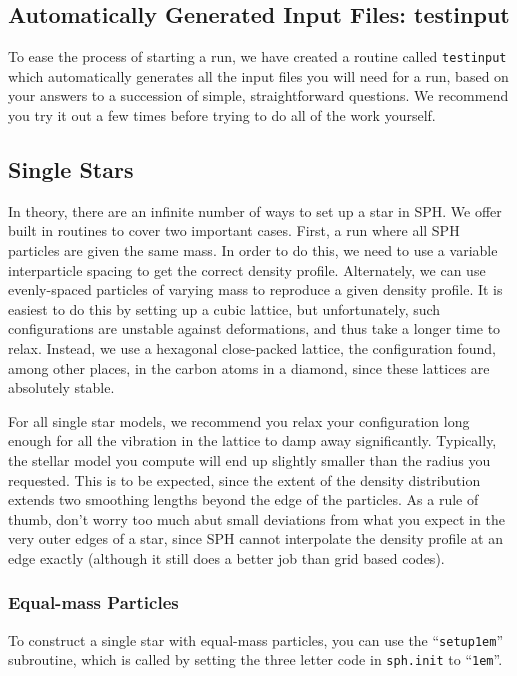 \subsection{Automatically Generated Input Files: testinput}
\label{in:test}

To ease the process of starting a run, we have created a routine
called {\tt testinput} which automatically generates all the input
files you will need for a run, based on your answers to a succession of
simple, straightforward questions. 
We recommend you try it out a few times before trying to do all of
the work yourself. 

\subsection{Single Stars}
\label{in:1s}
In theory, there are an infinite number of ways to set up a star in
SPH.  We offer built in routines to cover two important cases.  First,
a run where all SPH particles are given the same mass.  In order to do
this, we need to use a variable interparticle spacing to get the
correct density profile. Alternately, we can use evenly-spaced
particles of varying mass to reproduce a given density profile.  It is
easiest to do this by setting up a cubic lattice, but unfortunately,
such configurations are unstable against deformations, and thus take a
longer time to relax. Instead, we use a hexagonal close-packed
lattice, the configuration found, among other places, in the carbon
atoms in a diamond, since these lattices are absolutely stable.

For all single star models, we recommend you relax your configuration
long enough for all the vibration in the lattice to damp away
significantly.  Typically, the stellar model you compute will end up
slightly smaller than the radius you requested.  This is to be
expected, since the extent of the density distribution extends two
smoothing lengths beyond the edge of the particles.  As a rule of
thumb, don't worry too much abut small deviations from what you expect
in the very outer edges of a star, since SPH cannot interpolate the
density profile at an edge exactly (although it still does a better
job than grid based codes).

\subsubsection{Equal-mass Particles}
\label{in:1s:em}
To construct a single star with equal-mass particles, you can use the
``{\tt setup1em}'' subroutine, which is called by setting the three
letter code in {\tt sph.init} to ``{\tt 1em}''.  

